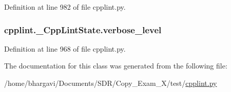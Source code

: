 Definition at line 982 of file cpplint.\+py.

\subsubsection[{\texorpdfstring{verbose\+\_\+level}{verbose_level}}]{\setlength{\rightskip}{0pt plus 5cm}cpplint.\+\_\+\+Cpp\+Lint\+State.\+verbose\+\_\+level}\hypertarget{classcpplint_1_1___cpp_lint_state_a94328754c2f7481f4da9757a9dede308}{}\label{classcpplint_1_1___cpp_lint_state_a94328754c2f7481f4da9757a9dede308}


Definition at line 968 of file cpplint.\+py.



The documentation for this class was generated from the following file\+:\begin{DoxyCompactItemize}
\item 
/home/bhargavi/\+Documents/\+S\+D\+R/\+Copy\+\_\+\+Exam\+\_\+X/test/\hyperlink{cpplint_8py}{cpplint.\+py}\end{DoxyCompactItemize}

